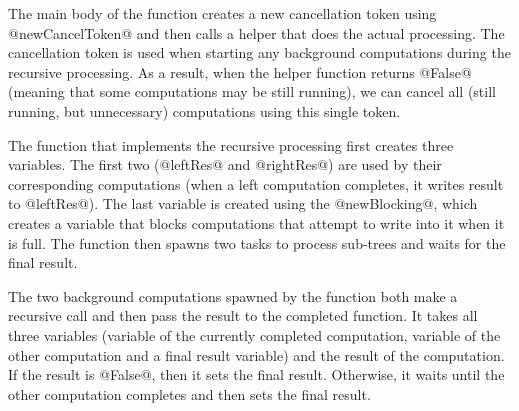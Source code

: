 \documentclass[preprint]{sigplanconf}
\begin{document}
The main body of the function creates a new cancellation token using @newCancelToken@ and then 
calls a helper that does the actual processing. The cancellation token is used when starting any 
background computations during the recursive processing. As a result, when the helper function returns 
@False@ (meaning that some computations may be still running), we can cancel all (still running, but 
unnecessary) computations using this single token.

The function that implements the recursive processing first creates three variables. The first two 
(@leftRes@ and @rightRes@) are used by their corresponding computations (when a left computation completes, 
it writes result to @leftRes@). The last variable is created using the @newBlocking@, which creates a
variable that blocks computations that attempt to write into it when it is full. The function then spawns 
two tasks to process sub-trees and waits for the final result.

The two background computations spawned by the function both make a recursive call and then pass the 
result to the completed function. It takes all three variables (variable of the currently completed 
computation, variable of the other computation and a final result variable) and the result of the 
computation. If the result is @False@, then it sets the final result. Otherwise, it waits until the 
other computation completes and then sets the final result.
\end{document}
